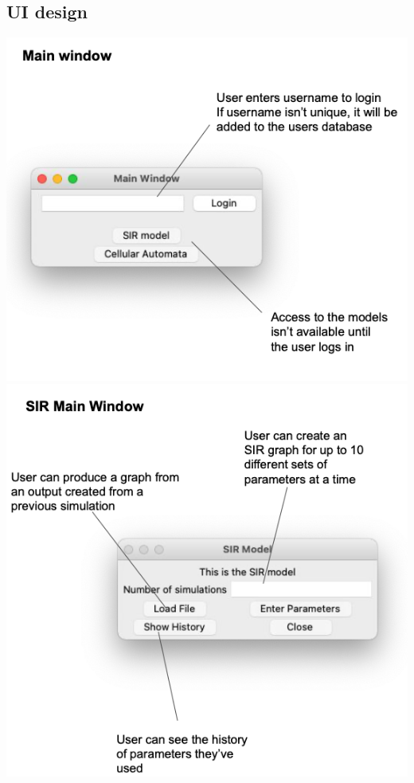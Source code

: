 \documentclass[11pt, a4paper]{article}
\begin{document}
\subsection{UI design}
\includegraphics[width=\textwidth]{a_main_window.png}
\includegraphics[width=\textwidth]{a_sir_main.png}
\end{document}

